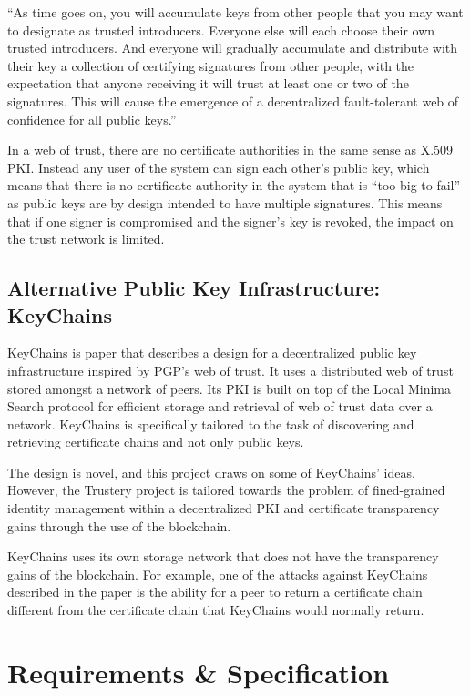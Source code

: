 \documentclass[12pt]{report}
\begin{document}
	``As time goes on, you will accumulate keys from other people that you may want to designate as trusted introducers. Everyone else will each choose their own trusted introducers. And everyone will gradually accumulate and distribute with their key a collection of certifying signatures from other people, with the expectation that anyone receiving it will trust at least one or two of the signatures. This will cause the emergence of a decentralized fault-tolerant web of confidence for all public keys.''
	
	In a web of trust, there are no certificate authorities in the same sense as X.509 PKI. Instead any user of the system can sign each other's public key, which means that there is no certificate authority in the system that is ``too big to fail'' as public keys are by design intended to have multiple signatures. This means that if one signer is compromised and the signer's key is revoked, the impact on the trust network is limited.
	
	\section{Alternative Public Key Infrastructure: KeyChains}
	KeyChains is paper that describes a design for a decentralized public key infrastructure inspired by PGP's web of trust. It uses a distributed web of trust stored amongst a network of peers. Its PKI is built on top of the Local Minima Search protocol for efficient storage and retrieval of web of trust data over a network. KeyChains is specifically tailored to the task of discovering and retrieving certificate chains and not only public keys.\cite{30}
	
	The design is novel, and this project draws on some of KeyChains' ideas. However, the Trustery project is tailored towards the problem of fined-grained identity management within a decentralized PKI and certificate transparency gains through the use of the blockchain.
	
	KeyChains uses its own storage network that does not have the transparency gains of the blockchain. For example, one of the attacks against KeyChains described in the paper is the ability for a peer to return a certificate chain different from the certificate chain that KeyChains would normally return.
	
	\chapter{Requirements \& Specification}
\end{document}
